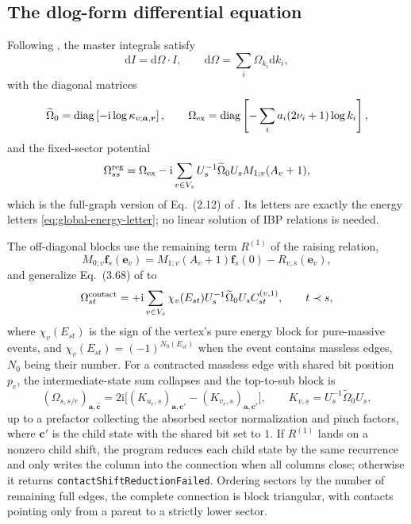 \documentclass[11pt,a4paper]{article}
\newcommand{\dd}{\mathrm d}
\newcommand{\ii}{\mathrm i}
\newcommand{\diag}{\operatorname{diag}}
\begin{document}
\subsection{The \texorpdfstring{dlog}{dlog}-form differential equation}
\label{sec:dlog}

Following \citet{Chen:2024jms}, the master integrals satisfy
\begin{equation}
  \dd I=\dd\Omega\cdot I,
  \qquad
  \dd\Omega=\sum_i\Omega_{k_i}\dd k_i,
\end{equation}
with the diagonal matrices
\begin{equation}
  \widetilde\Omega_0=\diag\left[-\ii\log\kappa_{v;\bm a,\bm r}\right],
  \qquad
  \Omega_{\rm ex}=\diag\left[-\sum_i a_i(2\nu_i+1)\log k_i\right],
\end{equation}
and the fixed-sector potential
\begin{equation}
  \Omega_{ss}^{\rm reg}
  =\Omega_{\rm ex}
  -\ii\sum_{v\in V_s}
  U_s^{-1}\widetilde\Omega_0 U_s
  M_{1;v}(A_v+1),
  \label{eq:global-diagonal-omega}
\end{equation}
which is the full-graph version of Eq.~(2.12) of \citet{Chen:2024jms}. Its letters are exactly the
energy letters \eqref{eq:global-energy-letter}; no linear solution of IBP relations is needed.

The off-diagonal blocks use the remaining term $R^{(1)}$ of the raising relation,
\begin{equation}
  M_{0;v}\bm f_s(\bm e_v)=M_{1;v}(A_v+1)\bm f_s(0)-R_{v,s}(\bm e_v),
\end{equation}
and generalize Eq.~(3.68) of \citet{Chen:2023eic} to
\begin{equation}
  \Omega_{st}^{\rm contact}
  =+\ii\sum_{v\in V_s}\chi_v(E_{st})
  U_s^{-1}\widetilde\Omega_0 U_s
  C_{st}^{(v,1)},
  \qquad t\prec s,
  \label{eq:global-offdiagonal-omega}
\end{equation}
where $\chi_v(E_{st})$ is the sign of the vertex's pure energy block for pure-massive events, and
$\chi_v(E_{st})=(-1)^{N_0(E_{st})}$ when the event contains massless edges, $N_0$ being their
number. For a contracted massless edge with shared bit position $p_e$, the intermediate-state sum
collapses and the top-to-sub block is
\begin{equation}
  \left(\Omega_{s,s/e}\right)_{\bm a,\widehat{\bm c}}
  =2\ii\Big[
  (K_{u_e,s})_{\bm a,\bm c'}
  -(K_{v_e,s})_{\bm a,\bm c'}
  \Big],
  \qquad
  K_{v,s}=U_s^{-1}\widetilde\Omega_0 U_s,
  \label{eq:massless-binary-top-to-sub}
\end{equation}
up to a prefactor collecting the absorbed sector normalization and pinch factors, where $\bm c'$ is
the child state with the shared bit set to $1$. If $R^{(1)}$ lands on a nonzero child shift, the
program reduces each child state by the same recurrence and only writes the column into the
connection when all columns close; otherwise it returns \texttt{contactShiftReductionFailed}.
Ordering sectors by the number of remaining full edges, the complete connection is block
triangular, with contacts pointing only from a parent to a strictly lower sector.
\end{document}
